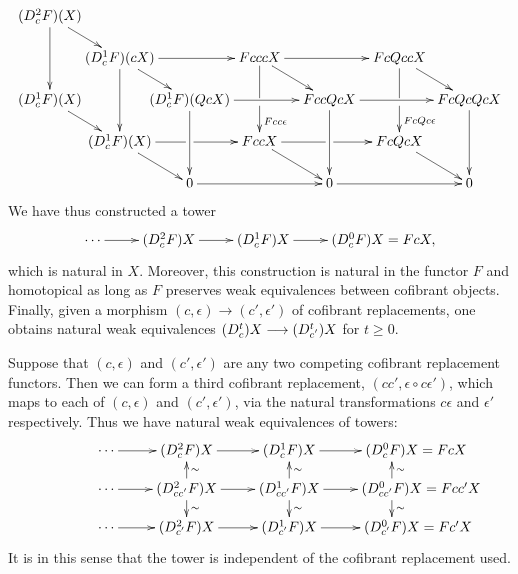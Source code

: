 \documentclass[10pt]{article}
\begin{document}
\begin{convergence}
\[\def\labelstyle{\scriptstyle}
\xymatrix@!0@R=30pt@C=50pt{
(\dupdown{2}{c}F)(X)\ar[dr]\ar[dd]\\
&(\dupdown{1}{c}F)(cX) \ar[rr]\ar[rd]\ar[dd]         &           &FcccX \ar[rr]\ar[rd]\ar'[d][dd]^{Fcc\epsilon}         &           &   FcQccX \ar'[d][dd]^{FcQc\epsilon}           \ar[dr]  &                  \\
(\dupdown{1}{c}F)(X)\ar[dr]&        &  (\dupdown{1}{c}F)(QcX) \ar[rr] \ar[dd]  &                     &  FccQcX \ar[rr] \ar[dd]  &             & FcQcQcX
         \ar[dd] \\
&(\dupdown{1}{c}F)(X) \ar'[r][rr] \ar[dr] &        &   FccX \ar'[r][rr] \ar[dr] &        &   FcQcX
\ar[dr] &                   \\
&        &   0 \ar[rr]      &               &   0 \ar[rr]      &                    &
0
}\]
We have thus constructed a tower
\[\xymatrix@R=4mm{
\cdots 
\ar[r]
&%
(\dupdown{2}{c}F)X
\ar[r]
&%
(\dupdown{1}{c}F)X
\ar[r]&%
(\dupdown{0}{c}F)X=FcX,
}\]
which is natural in $X$.
Moreover, this construction is natural in the functor $F$ and homotopical as long as $F$ preserves weak equivalences between cofibrant objects. Finally, given a morphism $(c,\epsilon)\to (c',\epsilon')$ of cofibrant replacements, one obtains natural weak equivalences $(D^{\smash{t}}_{\smash{c}})X\longrightarrow(D^{\smash{t}}_{\smash{c'}})X$ for $t\geq0$.

Suppose that $(c,\epsilon)$ and $(c',\epsilon')$ are any two competing cofibrant replacement functors. Then we can form a third cofibrant replacement, $(cc',\epsilon\circ c\epsilon')$, which maps to each of $(c,\epsilon)$ and $(c',\epsilon')$, via the natural transformations $c\epsilon$ and $\epsilon'$ respectively. Thus we have natural weak equivalences of towers:
\[\xymatrix@R=4mm{
\cdots 
\ar[r]
&%
(\dupdown{2}{c}F)X
\ar[r]
&%
(\dupdown{1}{c}F)X
\ar[r]&%
(\dupdown{0}{c}F)X\makebox[0pt][l]{$\mbox{}=FcX$}\\
\cdots 
\ar[r]
&%
(\dupdown{2}{cc'}F)X
\ar[u]_-{\sim}
\ar[d]^-{\sim}
\ar[r]
&%
(\dupdown{1}{cc'}F)X
\ar[u]_-{\sim}
\ar[d]^-{\sim}
\ar[r]&%
(\dupdown{0}{cc'}F)X\makebox[0pt][l]{$\mbox{}=Fcc'X$}
\ar[u]_-{\sim}
\ar[d]^-{\sim}\\
\cdots 
\ar[r]
&%
(\dupdown{2}{c'}F)X
\ar[r]
&%
(\dupdown{1}{c'}F)X
\ar[r]&%
(\dupdown{0}{c'}F)X\makebox[0pt][l]{$\mbox{}=Fc'X$}
}\]
It is in this sense that the tower is independent of the cofibrant replacement used.




\end{convergence}
\end{document}

